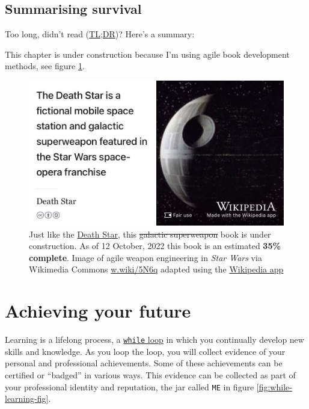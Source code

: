 \documentclass[
]{book}
\begin{document}
\hypertarget{tldr10}{%
\section{Summarising survival}\label{tldr10}}

Too long, didn't read (\href{https://en.wiktionary.org/wiki/too_long;_didn\%27t_read}{TL;DR})? Here's a summary:

This chapter is under construction because I'm using agile book development methods, see figure \ref{fig:deathstar7-fig}.

\begin{figure}

{\centering \includegraphics[width=0.99\linewidth]{images/DeathStar2} 

}

\caption{Just like the \href{https://en.wikipedia.org/wiki/Death_Star}{Death Star}, this \sout{galactic superweapon} book is under construction. As of 12 October, 2022 this book is an estimated \textbf{35\% complete}. Image of agile weapon engineering in \emph{Star Wars} via Wikimedia Commons \href{https://w.wiki/5N6q}{w.wiki/5N6q} adapted using the \href{https://apps.apple.com/gb/app/wikipedia/id324715238}{Wikipedia app}}\label{fig:deathstar7-fig}
\end{figure}

\hypertarget{achieving}{%
\chapter{Achieving your future}\label{achieving}}

Learning is a lifelong process, a \href{https://en.wikipedia.org/wiki/While_loop}{\texttt{while} loop} in which you continually develop new skills and knowledge. As you loop the loop, you will collect evidence of your personal and professional achievements. Some of these achievements can be certified or ``badged'' in various ways. This evidence can be collected as part of your professional identity and reputation, the jar called \texttt{ME} in figure \ref{fig:while-learning-fig}.
\end{document}
